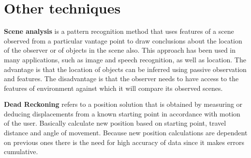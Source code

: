 \section{Other techniques}
\textbf{Scene analysis} is a pattern recognition method that uses features of a scene observed from a particular vantage point to draw conclusions about the location of the observer or of objects in the scene also.\cite{LSfUC} This approach has been used in many applications, such as image and speech recognition, as well as location.\cite{LSAWIFI} The advantage is that the location of objects can be inferred using passive observation and features. The disadvantage is that the observer needs to have access to the features of environment against which it will compare its observed scenes.\cite{LSfUC}

\textbf{Dead Reckoning} refers to a position solution that is obtained by measuring or deducing displacements from a known starting point in accordance with motion of the user.\cite{DRNS} Basically calculate new position based on starting point, travel distance and angle of movement. Because new position calculations are dependent on previous ones there is the need for high accuracy of data since it makes errors cumulative.\cite{IDRAIP}